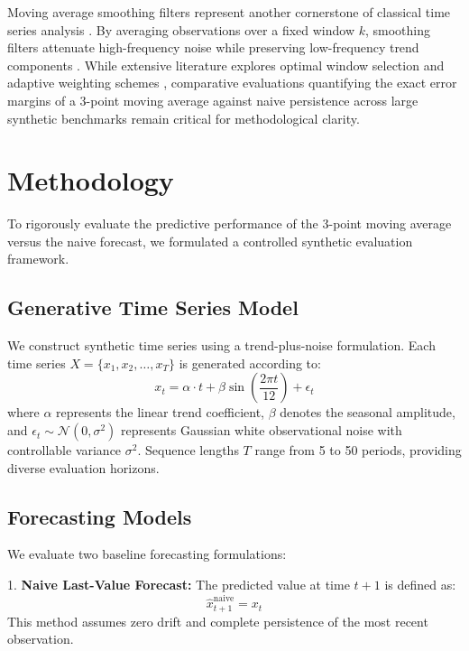 \documentclass[10pt,letterpaper]{article}
\begin{document}
Moving average smoothing filters represent another cornerstone of classical time series analysis \citep{pollock1999theory}. By averaging observations over a fixed window $k$, smoothing filters attenuate high-frequency noise while preserving low-frequency trend components \citep{niemela1994modelling}. While extensive literature explores optimal window selection \citep{harvey1989forecasting} and adaptive weighting schemes \citep{tsay2010analysis}, comparative evaluations quantifying the exact error margins of a 3-point moving average against naive persistence across large synthetic benchmarks remain critical for methodological clarity.

\section{Methodology}

To rigorously evaluate the predictive performance of the 3-point moving average versus the naive forecast, we formulated a controlled synthetic evaluation framework.

\subsection{Generative Time Series Model}

We construct synthetic time series using a trend-plus-noise formulation. Each time series $X = \{x_1, x_2, \dots, x_T\}$ is generated according to:
\begin{equation}
x_t = \alpha \cdot t + \beta \sin\left(\frac{2 \pi t}{12}\right) + \epsilon_t
\end{equation}
where $\alpha$ represents the linear trend coefficient, $\beta$ denotes the seasonal amplitude, and $\epsilon_t \sim \mathcal{N}(0, \sigma^2)$ represents Gaussian white observational noise with controllable variance $\sigma^2$. Sequence lengths $T$ range from 5 to 50 periods, providing diverse evaluation horizons.

\subsection{Forecasting Models}

We evaluate two baseline forecasting formulations:

1. \textbf{Naive Last-Value Forecast:} The predicted value at time $t+1$ is defined as:
\begin{equation}
\hat{x}_{t+1}^{\text{naive}} = x_t
\end{equation}
This method assumes zero drift and complete persistence of the most recent observation.
\end{document}
